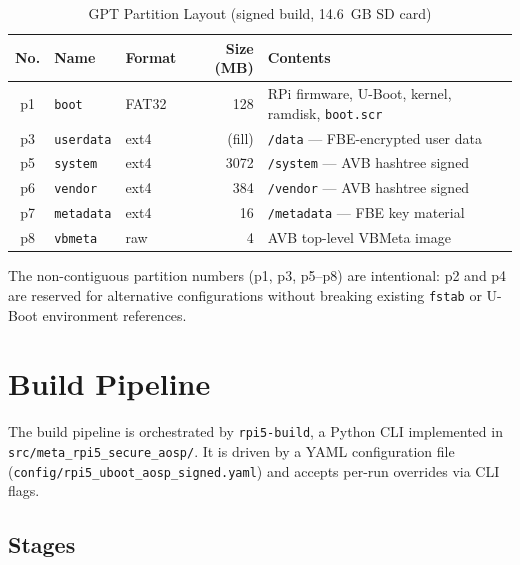 \begin{table}[h]
\centering
\caption{GPT Partition Layout (signed build, 14.6~GB SD card)}
\label{tab:partitions}
\begin{tabular}{cllrl}
\toprule
\textbf{No.} & \textbf{Name} & \textbf{Format} & \textbf{Size (MB)} & \textbf{Contents} \\
\midrule
p1 & \texttt{boot}     & FAT32 & 128    & RPi firmware, U-Boot, kernel, ramdisk, \texttt{boot.scr} \\
p3 & \texttt{userdata} & ext4  & (fill) & \texttt{/data} --- FBE-encrypted user data \\
p5 & \texttt{system}   & ext4  & 3072   & \texttt{/system} --- AVB hashtree signed \\
p6 & \texttt{vendor}   & ext4  & 384    & \texttt{/vendor} --- AVB hashtree signed \\
p7 & \texttt{metadata} & ext4  & 16     & \texttt{/metadata} --- FBE key material \\
p8 & \texttt{vbmeta}   & raw   & 4      & AVB top-level VBMeta image \\
\bottomrule
\end{tabular}
\end{table}

The non-contiguous partition numbers (p1, p3, p5--p8) are intentional: p2 and p4 are reserved for alternative configurations without breaking existing \texttt{fstab} or U-Boot environment references.

\section{Build Pipeline}
\label{sec:arch_pipeline}

The build pipeline is orchestrated by \texttt{rpi5-build}, a Python CLI implemented in \texttt{src/meta\_rpi5\_secure\_aosp/}. It is driven by a YAML configuration file (\texttt{config/rpi5\_uboot\_aosp\_signed.yaml}) and accepts per-run overrides via CLI flags.

\subsection{Stages}

